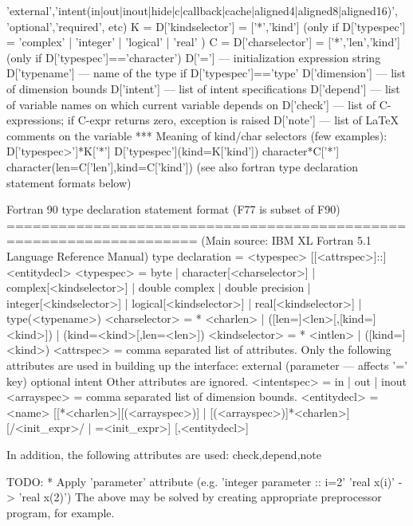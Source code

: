 \begin{DoxyVerb}
               'external','intent(in|out|inout|hide|c|callback|cache|aligned4|aligned8|aligned16)',
               'optional','required', etc)
     K = D['kindselector'] = {['*','kind']} (only if D['typespec'] =
                 'complex' | 'integer' | 'logical' | 'real' )
     C = D['charselector'] = {['*','len','kind']}
                     (only if D['typespec']=='character')
     D['='] --- initialization expression string
     D['typename'] --- name of the type if D['typespec']=='type'
     D['dimension'] --- list of dimension bounds
     D['intent'] --- list of intent specifications
     D['depend'] --- list of variable names on which current variable depends on
     D['check'] --- list of C-expressions; if C-expr returns zero, exception is raised
     D['note'] --- list of LaTeX comments on the variable
 *** Meaning of kind/char selectors (few examples):
     D['typespec>']*K['*']
     D['typespec'](kind=K['kind'])
     character*C['*']
     character(len=C['len'],kind=C['kind'])
     (see also fortran type declaration statement formats below)

Fortran 90 type declaration statement format (F77 is subset of F90)
====================================================================
(Main source: IBM XL Fortran 5.1 Language Reference Manual)
type declaration = <typespec> [[<attrspec>]::] <entitydecl>
<typespec> = byte                          |
     character[<charselector>]     |
     complex[<kindselector>]       |
     double complex                |
     double precision              |
     integer[<kindselector>]       |
     logical[<kindselector>]       |
     real[<kindselector>]          |
     type(<typename>)
<charselector> = * <charlen>               |
     ([len=]<len>[,[kind=]<kind>]) |
     (kind=<kind>[,len=<len>])
<kindselector> = * <intlen>                |
     ([kind=]<kind>)
<attrspec> = comma separated list of attributes.
     Only the following attributes are used in
     building up the interface:
        external
        (parameter --- affects '=' key)
        optional
        intent
     Other attributes are ignored.
<intentspec> = in | out | inout
<arrayspec> = comma separated list of dimension bounds.
<entitydecl> = <name> [[*<charlen>][(<arrayspec>)] | [(<arrayspec>)]*<charlen>]
              [/<init_expr>/ | =<init_expr>] [,<entitydecl>]

In addition, the following attributes are used: check,depend,note

TODO:
    * Apply 'parameter' attribute (e.g. 'integer parameter :: i=2' 'real x(i)'
                           -> 'real x(2)')
    The above may be solved by creating appropriate preprocessor program, for example.\end{DoxyVerb}
 

